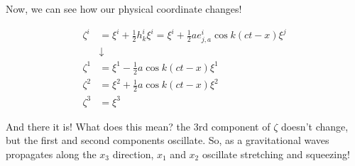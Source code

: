 \documentclass{article}
\begin{document}
Now, we can see how our physical coordinate changes!

\begin{align}
    \zeta^i &= \xi^i + \frac{1}{2}h_k^i\xi^i = \xi^i + \frac{1}{2}a e_{j,a}^i \cos k(ct - x) \xi^j\\
    &\downarrow \\
    \zeta^1 &= \xi^1 - \frac{1}{2}a \cos k(ct - x) \xi^1 \\
    \zeta^2 &= \xi^2 + \frac{1}{2}a \cos k(ct - x) \xi^2 \\
    \zeta^3 &= \xi^3
\end{align}

And there it is! What does this mean? the 3rd component of $\zeta$ doesn't change, but the first and second components oscillate. So, as a gravitational waves propagates along the $x_3$ direction, $x_1$ and $x_2$ oscillate stretching and squeezing! 



%
\end{document}
